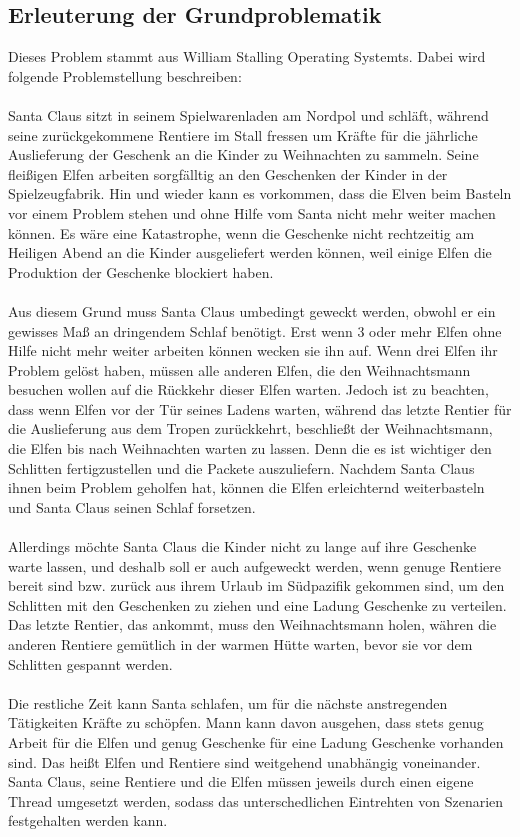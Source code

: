 \documentclass[a4paper,12pt]{exam}
\begin{document}
\subsection{Erleuterung der Grundproblematik}
Dieses Problem stammt aus William Stalling Operating Systemts. Dabei wird folgende Problemstellung beschreiben:\\ 
\\Santa Claus sitzt in seinem Spielwarenladen am Nordpol und schläft, während seine zurückgekommene Rentiere im Stall fressen
um Kräfte für die jährliche Auslieferung der Geschenk an die Kinder zu Weihnachten zu sammeln. Seine fleißigen Elfen arbeiten sorgfälltig an den Geschenken der Kinder
in der Spielzeugfabrik. Hin und wieder kann es vorkommen, dass die Elven beim Basteln vor einem Problem stehen und ohne Hilfe vom Santa nicht mehr weiter machen können.
Es wäre eine Katastrophe, wenn die Geschenke nicht rechtzeitig am Heiligen Abend an die Kinder ausgeliefert werden können, weil einige Elfen die Produktion der Geschenke blockiert haben. \\\\
Aus diesem Grund muss Santa Claus umbedingt geweckt werden, obwohl er ein gewisses Maß an dringendem Schlaf benötigt. Erst wenn 3 oder mehr Elfen ohne Hilfe nicht mehr weiter arbeiten können wecken sie ihn auf.
Wenn drei Elfen ihr Problem gelöst haben, müssen alle anderen Elfen, die den Weihnachtsmann besuchen wollen auf die Rückkehr dieser Elfen warten.
Jedoch ist zu beachten, dass wenn Elfen vor der Tür seines Ladens warten, während das letzte Rentier für die Auslieferung aus dem Tropen zurückkehrt, beschließt der Weihnachtsmann, die Elfen bis nach Weihnachten warten zu lassen. Denn die es ist wichtiger den Schlitten
fertigzustellen und die Packete auszuliefern.
Nachdem Santa Claus ihnen beim Problem geholfen hat, können die Elfen erleichternd weiterbasteln und Santa Claus seinen Schlaf forsetzen.\\
\\Allerdings möchte Santa Claus die Kinder nicht zu lange auf ihre Geschenke warte lassen, und deshalb soll er auch aufgeweckt werden, wenn genuge Rentiere bereit sind bzw. zurück aus ihrem Urlaub im Südpazifik gekommen sind, um den 
Schlitten mit den Geschenken zu ziehen und eine Ladung Geschenke zu verteilen. Das letzte Rentier, das ankommt, muss den Weihnachtsmann holen, währen die anderen Rentiere gemütlich in der warmen Hütte warten, bevor sie vor dem Schlitten gespannt werden.\\
\\Die restliche Zeit kann Santa schlafen, um für die nächste anstregenden Tätigkeiten Kräfte zu schöpfen. Mann kann davon ausgehen, dass stets genug Arbeit für die Elfen und genug Geschenke für eine Ladung Geschenke vorhanden sind.
Das heißt Elfen und Rentiere sind weitgehend unabhängig voneinander. Santa Claus, seine Rentiere und die Elfen müssen jeweils durch einen eigene Thread umgesetzt werden, sodass das unterschedlichen Eintrehten von Szenarien festgehalten werden kann.
\newpage
\end{document}
